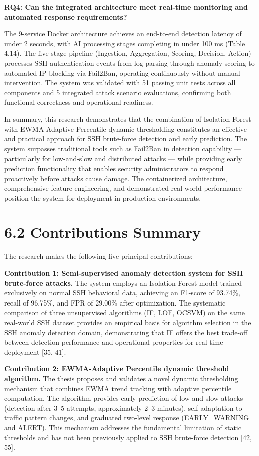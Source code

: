 \documentclass[
  a4paper]{report}
\begin{document}
\textbf{RQ4: Can the integrated architecture meet real-time monitoring
and automated response requirements?}

The 9-service Docker architecture achieves an end-to-end detection
latency of under 2 seconds, with AI processing stages completing in
under 100 ms (Table 4.14). The five-stage pipeline (Ingestion,
Aggregation, Scoring, Decision, Action) processes SSH authentication
events from log parsing through anomaly scoring to automated IP blocking
via Fail2Ban, operating continuously without manual intervention. The
system was validated with 51 passing unit tests across all components
and 5 integrated attack scenario evaluations, confirming both functional
correctness and operational readiness.

In summary, this research demonstrates that the combination of Isolation
Forest with EWMA-Adaptive Percentile dynamic thresholding constitutes an
effective and practical approach for SSH brute-force detection and early
prediction. The system surpasses traditional tools such as Fail2Ban in
detection capability --- particularly for low-and-slow and distributed
attacks --- while providing early prediction functionality that enables
security administrators to respond proactively before attacks cause
damage. The containerized architecture, comprehensive feature
engineering, and demonstrated real-world performance position the system
for deployment in production environments.

\section{6.2 Contributions Summary}\label{contributions-summary}

The research makes the following five principal contributions:

\textbf{Contribution 1: Semi-supervised anomaly detection system for SSH
brute-force attacks.} The system employs an Isolation Forest model
trained exclusively on normal SSH behavioral data, achieving an F1-score
of 93.74\%, recall of 96.75\%, and FPR of 29.00\% after optimization.
The systematic comparison of three unsupervised algorithms (IF, LOF,
OCSVM) on the same real-world SSH dataset provides an empirical basis
for algorithm selection in the SSH anomaly detection domain,
demonstrating that IF offers the best trade-off between detection
performance and operational properties for real-time deployment {[}35,
41{]}.

\textbf{Contribution 2: EWMA-Adaptive Percentile dynamic threshold
algorithm.} The thesis proposes and validates a novel dynamic
thresholding mechanism that combines EWMA trend tracking with adaptive
percentile computation. The algorithm provides early prediction of
low-and-slow attacks (detection after 3--5 attempts, approximately 2--3
minutes), self-adaptation to traffic pattern changes, and graduated
two-level response (EARLY\_WARNING and ALERT). This mechanism addresses
the fundamental limitation of static thresholds and has not been
previously applied to SSH brute-force detection {[}42, 55{]}.
\end{document}

